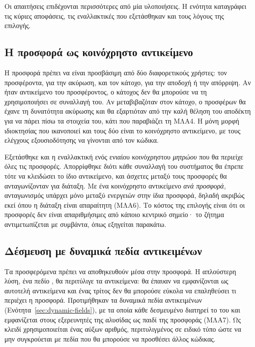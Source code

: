 Οι απαιτήσεις επιδέχονται περισσότερες από μία υλοποιήσεις. Η ενότητα καταγράφει τις
κύριες αποφάσεις, τις εναλλακτικές που εξετάσθηκαν και τους λόγους της επιλογής.

\subsection{Η προσφορά ως κοινόχρηστο αντικείμενο}

Η προσφορά πρέπει να είναι προσβάσιμη από δύο διαφορετικούς χρήστες: τον προσφέροντα, για
την ακύρωση, και τον κάτοχο, για την αποδοχή ή την απόρριψη. Αν ήταν αντικείμενο του
προσφέροντος, ο κάτοχος δεν θα μπορούσε να τη χρησιμοποιήσει σε συναλλαγή του. Αν
μεταβιβαζόταν στον κάτοχο, ο προσφέρων θα έχανε τη δυνατότητα ακύρωσης και θα εξαρτιόταν
από την καλή θέληση του αποδέκτη για να πάρει πίσω τα στοιχεία του, κάτι που παραβιάζει τη
ΜΛΑ4. Η μόνη μορφή ιδιοκτησίας που ικανοποιεί και τους δύο είναι το κοινόχρηστο
αντικείμενο, με τους ελέγχους εξουσιοδότησης να γίνονται από τον κώδικα.

Εξετάσθηκε και η εναλλακτική ενός ενιαίου κοινόχρηστου \emph{μητρώου} που θα περιείχε όλες
τις προσφορές. Απορρίφθηκε διότι κάθε συναλλαγή του συστήματος θα έπρεπε τότε να κλειδώσει
το ίδιο αντικείμενο, και άσχετες μεταξύ τους προσφορές θα ανταγωνίζονταν για διάταξη. Με
ένα κοινόχρηστο αντικείμενο \emph{ανά προσφορά}, ανταγωνισμός υπάρχει μόνο μεταξύ
ενεργειών στην ίδια προσφορά, δηλαδή ακριβώς εκεί όπου η διάταξη είναι απαραίτητη (ΜΛΑ6).
Το κόστος της επιλογής είναι ότι οι προσφορές δεν είναι απαριθμήσιμες από κάποιο κεντρικό
σημείο· το ζήτημα αντιμετωπίζεται με συμβάντα, όπως εξηγείται παρακάτω.

\subsection{Δέσμευση με δυναμικά πεδία αντικειμένων}

Τα προσφερόμενα  πρέπει να αποθηκευθούν μέσα στην προσφορά. Η απλούστερη λύση,
ένα πεδίο , θα περιτύλιγε τα αντικείμενα: θα έπαυαν να εμφανίζονται
ως αυτοτελή αντικείμενα και ένας τρίτος δεν θα μπορούσε εύκολα να επαληθεύσει τι περιέχει
η προσφορά. Προτιμήθηκαν τα δυναμικά πεδία αντικειμένων
(Ενότητα~\ref{sec:dynamic-fields}), με τα οποία κάθε δεσμευμένο  διατηρεί το
 του και εμφανίζεται στους εξερευνητές της αλυσίδας ως παιδί της προσφοράς (ΜΛΑ7). Ως κλειδί
χρησιμοποιείται ένας αύξων αριθμός, περιτυλιγμένος σε ειδικό τύπο ώστε να μην συγκρούεται
με πεδία που θα μπορούσε να προσθέσει άλλος κώδικας.

